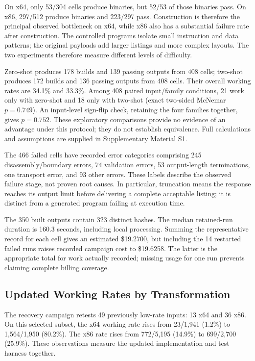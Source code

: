On x64, only 53/304 cells produce binaries, but 52/53 of those binaries
pass. On x86, 297/512 produce binaries and 223/297 pass. Construction is
therefore the principal observed bottleneck on x64, while x86 also has a
substantial failure rate after construction. The controlled programs isolate small instruction and data patterns;
the original payloads add larger listings and more complex layouts.
The two experiments therefore measure different levels of difficulty.

Zero-shot produces 178 builds and 139 passing outputs from 408 cells;
two-shot produces 172 builds and 136 passing outputs from 408 cells.
Their overall working rates are 34.1\% and 33.3\%. Among 408 paired
input/family conditions, 21 work only with zero-shot and 18 only with
two-shot (exact two-sided McNemar $p=0.749$). An input-level sign-flip
check, retaining the four families together, gives $p=0.752$. These
exploratory comparisons provide no evidence of an advantage under this
protocol; they do not establish equivalence. Full calculations and
assumptions are supplied in Supplementary Material S1.

The 466 failed cells have recorded error categories comprising 245
disassembly/boundary errors, 74 validation errors, 53 output-length
terminations, one transport error, and 93 other errors. These labels
describe the observed failure stage, not proven root causes. In particular,
truncation means the response reaches its output limit before delivering
a complete acceptable listing; it is distinct from a generated program
failing at execution time.

The 350 built outputs contain 323 distinct hashes. The median retained-run duration is
160.3 seconds, including local processing. Summing the representative
record for each cell gives an estimated \$19.2700, but including the
14 restarted failed runs raises recorded campaign cost to
\$19.6258. The latter is the appropriate total for work actually recorded;
missing usage for one run prevents claiming complete billing coverage.

\subsection{Updated Working Rates by Transformation}
\label{sec:recovery}
The recovery campaign retests 49 previously low-rate inputs: 13 x64 and
36 x86. On this selected subset, the x64 working rate rises from
23/1,941 (1.2\%) to 1,564/1,950 (80.2\%). The x86 rate rises from
772/5,195 (14.9\%) to 699/2,700 (25.9\%). These observations measure
the updated implementation and test harness together.

